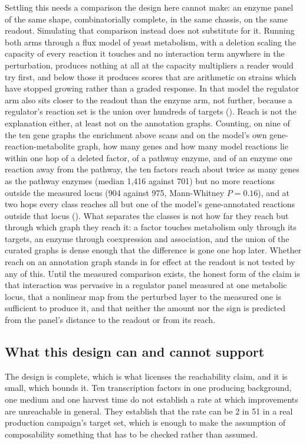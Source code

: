 Settling this needs a comparison the design here cannot make: an enzyme panel of the same
shape, combinatorially complete, in the same chassis, on the same readout. Simulating that
comparison instead does not substitute for it. Running both arms through a flux model of
yeast metabolism, with a deletion scaling the capacity of every reaction it touches and no
interaction term anywhere in the perturbation, produces nothing at all at the capacity
multipliers a reader would try first, and below those it produces scores that are
arithmetic on strains which have stopped growing rather than a graded response. In that
model the regulator arm also sits closer to the readout than the enzyme arm, not further,
because a regulator's reaction set is the union over hundreds of targets
(). Reach is not the explanation either, at least not on the
annotation graphs. Counting, on nine of the ten gene graphs the enrichment
above scans and on the model's own gene-reaction-metabolite graph, how many genes and how
many model reactions lie within one hop of a deleted factor, of a pathway enzyme, and of an
enzyme one reaction away from the pathway, the ten factors reach about twice as many genes
as the pathway enzymes (median 1,416 against 701) but no more reactions outside the
measured locus (904 against 975, Mann-Whitney $P = 0.16$), and at two hops every class reaches all but one
of the model's gene-annotated reactions outside that locus (). What
separates the classes is not how far they reach but through which graph they reach it: a
factor touches metabolism only through its targets, an enzyme through coexpression and
association, and the union of the curated graphs is dense enough that the difference is
gone one hop later. Whether reach on an annotation graph stands in for effect at the
readout is not tested by any of this. Until the measured comparison exists, the honest
form of the claim is that interaction was pervasive in a regulator panel measured at one
metabolic locus, that a nonlinear map from the perturbed layer to the measured one is
sufficient to produce it, and that neither the amount nor the sign is predicted from the
panel's distance to the readout or from its reach.

\subsection*{What this design can and cannot support}

The design is complete, which is what licenses the reachability claim, and it is small, which
bounds it. Ten transcription factors in one producing background, one medium and one
harvest time do not establish a rate at which improvements are unreachable in general. They
establish that the rate can be 2 in 51 in a real production campaign's target set, which is
enough to make the assumption of composability something that has to be checked rather than
assumed.

